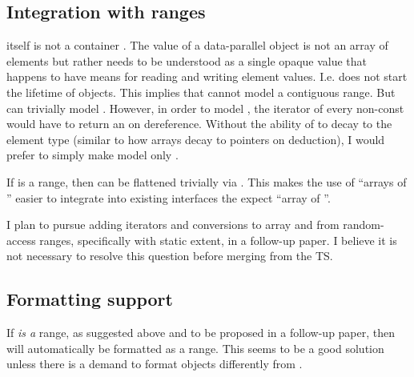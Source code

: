 \subsection{Integration with ranges}\label{sec:ranges}
 itself is not a container \cite{P0851R0}.
The value of a data-parallel object is not an array of elements but rather needs to be understood as a single opaque value that happens to have means for reading and writing element values.
I.e.  does not start the lifetime of  objects.
This implies that  cannot model a contiguous range.
But  can trivially model .
However, in order to model , the iterator of every non-const
 would have to return an  on dereference.
Without the ability of  to decay to the element type
(similar to how arrays decay to pointers on deduction), I would prefer to
simply make  model only .

If  is a range, then \std{} can
be flattened trivially via .
This makes the use of ``arrays of '' easier to integrate into
existing interfaces the expect ``array of ''.

I plan to pursue adding iterators and conversions to array and from
random-access ranges, specifically  with static extent, in a
follow-up paper.
I believe it is not necessary to resolve this question before merging
 from the TS.

\subsection{Formatting support}\label{sec:formatting}
If  \emph{is a} range, as suggested above and to be proposed in a
follow-up paper, then  will automatically be formatted as a range.
This seems to be a good solution unless there is a demand to format 
objects differently from .

